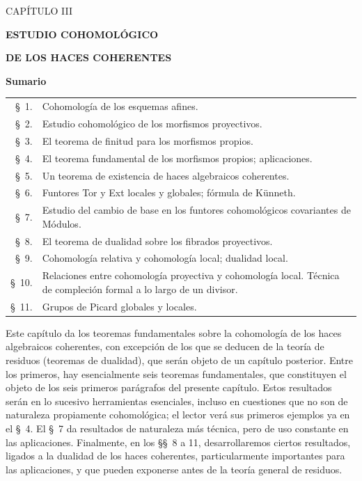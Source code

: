 \documentclass[10pt,oneside,openany]{book}
\theoremstyle{egaenv}\newtheorem*{env}{---}
\theoremstyle{egastatement}
\theoremstyle{egadescription}
\newcommand{\oldpage}[2][]{\marginnote{\normalfont\scriptsize\textbf{#1}\,|\,#2}\ignorespaces}
\begin{document}
\clearpage
\oldpage[0\textsubscript{III}]{80}
\thispagestyle{empty}
\null
\clearpage
\thispagestyle{plain}
\oldpage[III]{81}
\label{chapter:III-fr}

\begin{center}
{\large CAPÍTULO III\par}
\vspace{1.5em}
{\Large\bfseries ESTUDIO COHOMOLÓGICO\par}
{\Large\bfseries DE LOS HACES COHERENTES\par}
\vspace{1.8em}
{\bfseries Sumario\par}
\end{center}

\medskip
\begin{tabular}{@{}r@{\ }p{}@{}}
\S~1. & Cohomología de los esquemas afines.\\
\S~2. & Estudio cohomológico de los morfismos proyectivos.\\
\S~3. & El teorema de finitud para los morfismos propios.\\
\S~4. & El teorema fundamental de los morfismos propios; aplicaciones.\\
\S~5. & Un teorema de existencia de haces algebraicos coherentes.\\
\S~6. & Funtores Tor y Ext locales y globales; fórmula de Künneth.\\
\S~7. & Estudio del cambio de base en los funtores cohomológicos covariantes de Módulos.\\
\S~8. & El teorema de dualidad sobre los fibrados proyectivos.\\
\S~9. & Cohomología relativa y cohomología local; dualidad local.\\
\S~10. & Relaciones entre cohomología proyectiva y cohomología local. Técnica de compleción formal a lo largo de un divisor.\\
\S~11. & Grupos de Picard globales y locales\footnotemark.
\end{tabular}

\medskip
Este capítulo da los teoremas fundamentales sobre la cohomología de los haces algebraicos coherentes, con excepción de los que se deducen de la teoría de residuos (teoremas de dualidad), que serán objeto de un capítulo posterior. Entre los primeros, hay esencialmente seis teoremas fundamentales, que constituyen el objeto de los seis primeros parágrafos del presente capítulo. Estos resultados serán en lo sucesivo herramientas esenciales, incluso en cuestiones que no son de naturaleza propiamente cohomológica; el lector verá sus primeros ejemplos ya en el \S~4. El \S~7 da resultados de naturaleza más técnica, pero de uso constante en las aplicaciones. Finalmente, en los \S\S~8 a 11, desarrollaremos ciertos resultados, ligados a la dualidad de los haces coherentes, particularmente importantes para las aplicaciones, y que pueden exponerse antes de la teoría general de residuos.
\end{document}
